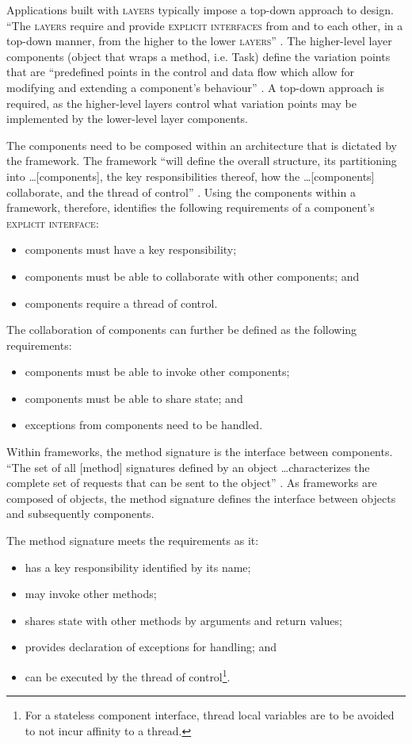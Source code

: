 \documentclass[prodmode]{style/acmlarge}
\begin{document}
Applications built with \textsc{layers} typically impose a top-down approach to
design.  ``The \textsc{layers} require and provide \textsc{explicit interfaces}
from and to each other, in a top-down manner, from the higher to the lower
\textsc{layers}'' \cite[p. 11]{ioc}.  The higher-level layer components (object
that wraps a method, i.e. Task) define the variation points that are
``predefined points in the control and data flow which allow for modifying and
extending a component's behaviour'' \cite[p. 5]{ioc}.  A top-down approach is
required, as the higher-level layers control what variation points may be
implemented by the lower-level layer components.

The components need to be composed within an architecture that is dictated by
the framework.  The framework ``will define the overall structure, its
partitioning into \ldots [components], the key responsibilities thereof, how the
\ldots [components] collaborate, and the thread of control'' \cite[p.26]{gof}.
Using the components within a framework, therefore, identifies the following
requirements of a component's \textsc{explicit interface}:
\begin{itemize}
  \item components must have a key responsibility;
  \item components must be able to collaborate with other components; and
  \item components require a thread of control.
\end{itemize}

The collaboration of components can further be defined as the following
requirements:
\begin{itemize}
  \item components must be able to invoke other components;
  \item components must be able to share state; and
  \item exceptions from components need to be handled.
\end{itemize}

Within frameworks, the method signature is the interface between components.
``The set of all [method] signatures defined by an object \ldots characterizes
the complete set of requests that can be sent to the object'' \cite[p. 13]{gof}.
As frameworks are composed of objects, the method signature defines the
interface between objects and subsequently components.

The method signature meets the requirements as it:
\begin{itemize}
  \item has a key responsibility identified by its name;
  \item may invoke other methods;
  \item shares state with other methods by arguments and return values;
  \item provides declaration of exceptions for handling; and
  \item can be executed by the thread of control\footnote{For a stateless component interface, thread local variables are to be avoided to not incur affinity to a thread.}.
\end{itemize}
\end{document}
